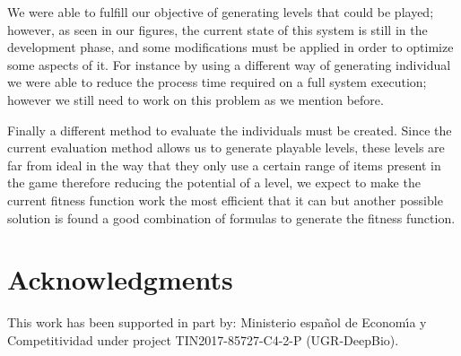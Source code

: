 \documentclass[conference]{IEEEtran}
\begin{document}
    We were able to fulfill our objective of generating levels that could be played;
    however, as seen in our figures, the current state of this system is still in the development 
    phase, and some modifications must be applied in order to optimize some aspects of it. For instance  
    by using a different way of generating individual we were able to reduce the process 
    time required on a full system execution; however we still need to work on this problem as
    we mention before.  %
    
    Finally a different method to evaluate the individuals must be created.
    Since the current evaluation method allows us to generate playable levels,
    these levels are far from ideal in the way that they only use a certain
    range of items present in the game therefore reducing the potential of a
    level, we expect to make the current fitness function work the most
    efficient that it can but another possible solution is found a good
    combination of formulas to generate the fitness function.

\section*{Acknowledgments}

This work has been supported in part by: Ministerio espa\~{n}ol de
Econom\'{\i}a y Competitividad under project TIN2017-85727-C4-2-P (UGR-DeepBio).




\end{document}
